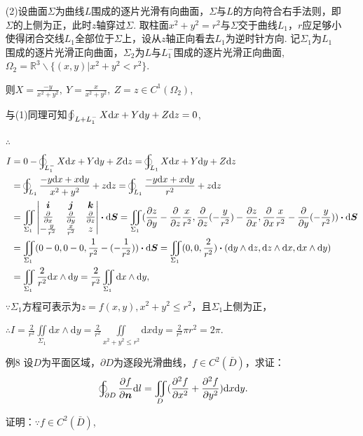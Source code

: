 \documentclass[12pt,UTF8,fleqn]{ctexart}
\newcommand{\varIInt}[4]{\iint\limits_{#1}#2\mathrm d#3\mathrm d#4}
\newcommand{\LOInt}[3]{\varoint\nolimits_{#1}#2\mathrm d#3}
\newcommand{\BLOInt}[2]{\varoint\nolimits_{#1}#2}
\newcommand{\md}[1]{\mathrm d#1}
\newcommand{\BSIInt}[2]{\iint\limits_{#1}#2}
\newcommand{\pp}[2]{\frac{\partial #1}{\partial #2}}
\begin{document}
\begin{enumerate}
(2)设曲面$\Sigma$为曲线$L$围成的逐片光滑有向曲面，$\Sigma$与$L$的方向符合右手法则，即$\Sigma$的上侧为正，此时$z$轴穿过$\Sigma$. 取柱面$x^2+y^2=r^2$与$\Sigma$交于曲线$L_1$，$r$应足够小使得闭合交线$L_1$全部位于$\Sigma$上，设从$z$轴正向看去$L_1$为逆时针方向. 记$\Sigma_1$为$L_1$围成的逐片光滑正向曲面，$\Sigma_2$为$L$与$L_1^-$围成的逐片光滑正向曲面, $\Omega_2=\mathbb R^3\backslash\{(x,y)|x^2+y^2<r^2\}$.

则$X=\frac{-y}{x^2+y^2},\ Y=\frac x{x^2+y^2},\ Z=z\in C^1(\Omega_2)$,

与(1)同理可知$\BLOInt{L+L_1^-}{X\md x+Y\md y+Z\md z}=0$,

$\therefore$
\[\begin{aligned}
I&=0-\BLOInt{L_1^-}{X\md x+Y\md y+Z\md z}=\BLOInt{L_1}{X\md x+Y\md y+Z\md z}\\
&=\BLOInt{L_1}{\frac{-y\md x+x\md y}{x^2+y^2}+z\md z}=\BLOInt{L_1}{\frac{-y\md x+x\md y}{r^2}+z\md z}\\
&=\BSIInt{\Sigma_1}{\begin{vmatrix}
\bm i&\bm j&\bm k\\
\frac\partial{\partial x}&\frac\partial{\partial y}&\frac\partial{\partial z}\\
-\frac y{r^2}&\frac x{r^2}&z
\end{vmatrix}\bm\cdot\md\bm S}=\BSIInt{\Sigma_1}{(\pp zy-\frac\partial{\partial z}\frac x{r^2},\frac\partial{\partial z}(-\frac y{r^2})-\pp zx,\frac\partial{\partial x}\frac x{r^2}-\frac\partial{\partial y}(-\frac y{r^2}))\bm\cdot\md\bm S}\\
&=\BSIInt{\Sigma_1}{(0-0,0-0,\frac 1{r^2}-(-\frac 1{r^2}))\bm\cdot\md\bm S}=\BSIInt{\Sigma_1}{(0,0,\frac 2{r^2})\bm\cdot(\md y\wedge\md z,\md z\wedge\md x,\md x\wedge\md y)}\\
&=\BSIInt{\Sigma_1}{\frac 2{r^2}\md x\wedge\md y}=\frac 2{r^2}\BSIInt{\Sigma_1}{\md x\wedge\md y},
\end{aligned}\]
$\because\Sigma_1$方程可表示为$z=f(x,y),x^2+y^2\leqslant r^2$，且$\Sigma_1$上侧为正，

$\therefore I=\frac 2{r^2}\BSIInt{\Sigma_1}{\md x\wedge\md y}=\frac2{r^2}\varIInt{x^2+y^2\leqslant r^2}{}xy=\frac2{r^2}\pi r^2=2\pi$.

\item[例8]设$D$为平面区域，$\partial D$为逐段光滑曲线，$f\in C^2(\bar{D})$，求证：
\[
\LOInt{\partial D}{\frac{\partial f}{\partial\bm n}}l=\varIInt D{(\frac{\partial^2f}{\partial x^2}+\frac{\partial^2f}{\partial y^2})}xy.
\]

证明：$\because f\in C^2(\bar{D})$,


\end{enumerate}
\end{document}
